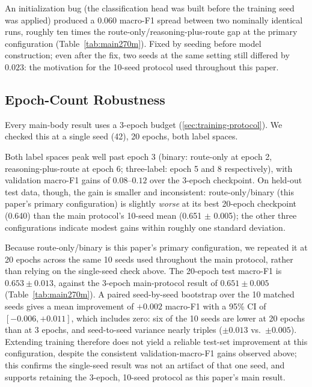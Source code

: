 \documentclass{article}
\begin{document}
An initialization bug (the classification head was built before the
training seed was applied) produced a $0.060$ macro-F1 spread between
two nominally identical runs, roughly ten times the
route-only/reasoning-plus-route gap at the primary configuration
(Table~\ref{tab:main270m}). Fixed by seeding before model construction;
even after the fix, two seeds at the same setting still differed by
$0.023$: the motivation for the 10-seed protocol used throughout
this paper.

\subsection{Epoch-Count Robustness}
\label{sec:epoch-count}

Every main-body result uses a 3-epoch budget
(\ref{sec:training-protocol}). We checked this at a single seed (42),
20 epochs, both label spaces.

Both label spaces peak well past epoch 3 (binary: route-only at epoch
2, reasoning-plus-route at epoch 6; three-label: epoch 5 and 8
respectively), with validation macro-F1 gains of $0.08$--$0.12$ over
the 3-epoch checkpoint. On held-out test data, though, the gain is
smaller and inconsistent: route-only/binary (this paper's primary
configuration) is slightly \emph{worse} at its best 20-epoch
checkpoint (0.640) than the main protocol's 10-seed mean (0.651 $\pm$
0.005); the other three configurations indicate modest gains within
roughly one standard deviation.

Because route-only/binary is this paper's primary configuration, we
repeated it at 20 epochs across the same 10 seeds used throughout the
main protocol, rather than relying on the single-seed check above.
The 20-epoch test macro-F1 is $0.653 \pm 0.013$, against the 3-epoch
main-protocol result of $0.651 \pm 0.005$ (Table~\ref{tab:main270m}).
A paired seed-by-seed bootstrap over the 10 matched seeds gives a
mean improvement of $+0.002$ macro-F1 with a 95\% CI of
$[-0.006, +0.011]$, which includes zero: six of the 10 seeds are
lower at 20 epochs than at 3 epochs, and seed-to-seed variance nearly
triples ($\pm 0.013$ vs.\ $\pm 0.005$). Extending training therefore
does not yield a reliable test-set improvement at this configuration,
despite the consistent validation-macro-F1 gains observed above; this
confirms the single-seed result was not an artifact of that one seed,
and supports retaining the 3-epoch, 10-seed protocol as this paper's
main result.

\newpage

\end{document}
